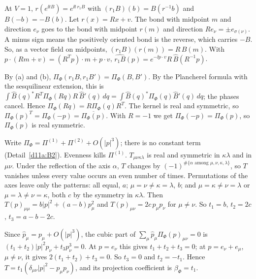\begin{detail}\label{d11a:B7}
\begin{step}
At $V=1$, $r(e^{\ii tB})=e^{\ii t\,r_1B}$ with $(r_1B)(b)=B(r^{-1}b)$ and $B(-b)=-B(b)$. Let $r(x)=Rx+v$. The bond with midpoint $m$ and direction $e_\nu$ goes to the bond with midpoint $r(m)$ and direction $Re_\nu=\pm e_{\sigma(\nu)}$. A minus sign means the positively oriented bond is the reverse, which carries $-B$. So, as a vector field on midpoints, $(r_1B)(r(m))=R\,B(m)$. With $p\cdot(Rm+v)=(R^Tp)\cdot m+p\cdot v$, $\widehat{r_1B}(p)=e^{-\ii p\cdot v}R\,\hat B(R^{-1}p)$.
\end{step}
\begin{step}
By (a) and (b), $\Pi_\Phi(r_1B,r_1B')=\Pi_\Phi(B,B')$. By the Plancherel formula with the sesquilinear extension, this is $\int\hat B(q)^*R^T\Pi_\Phi(Rq)R\,\hat B'(q)\,dq=\int\hat B(q)^*\Pi_\Phi(q)\hat B'(q)\,dq$; the phases cancel. Hence $\Pi_\Phi(Rq)=R\Pi_\Phi(q)R^T$. The kernel is real and symmetric, so $\Pi_\Phi(p)^T=\Pi_\Phi(-p)=\overline{\Pi_\Phi(p)}$. With $R=-1$ we get $\Pi_\Phi(-p)=\Pi_\Phi(p)$, so $\Pi_\Phi(p)$ is real symmetric.
\end{step}
\begin{step}
Write $\Pi_\Phi=\Pi^{(1)}+\Pi^{(2)}+O(|p|^3)$; there is no constant term (Detail~\ref{d11a:B2}). Evenness kills $\Pi^{(1)}$. $T_{\mu\nu\kappa\lambda}$ is real and symmetric in $\kappa\lambda$ and in $\mu\nu$. Under the reflection of the axis $\alpha$, $T$ changes by $(-1)^{\#\{\alpha\text{ among }\mu,\nu,\kappa,\lambda\}}$, so $T$ vanishes unless every value occurs an even number of times. Permutations of the axes leave only the patterns: all equal, $a$; $\mu=\nu\ne\kappa=\lambda$, $b$; and $\mu=\kappa\ne\nu=\lambda$ or $\mu=\lambda\ne\nu=\kappa$, both $c$ by the symmetry in $\kappa\lambda$. Then $T(p)_{\mu\mu}=b|p|^2+(a-b)p_\mu^2$ and $T(p)_{\mu\nu}=2c\,p_\mu p_\nu$ for $\mu\ne\nu$. So $t_1=b$, $t_2=2c$, $t_3=a-b-2c$.
\end{step}
\begin{step}[Transversality]
Since $\hat p_\mu=p_\mu+O(|p|^3)$, the cubic part of $\sum_\mu\hat p_\mu\Pi_\Phi(p)_{\mu\nu}=0$ is $(t_1+t_2)|p|^2p_\nu+t_3p_\nu^3=0$. At $p=e_\nu$ this gives $t_1+t_2+t_3=0$; at $p=e_\nu+e_\mu$, $\mu\ne\nu$, it gives $2(t_1+t_2)+t_3=0$. So $t_3=0$ and $t_2=-t_1$. Hence $T=t_1(\delta_{\mu\nu}|p|^2-p_\mu p_\nu)$, and its projection coefficient is $\beta_\Phi=t_1$.
\end{step}
\end{detail}


